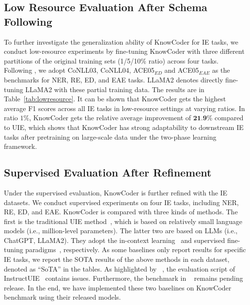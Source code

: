 \subsection{Low Resource Evaluation After Schema Following} 

To further investigate the generalization ability of KnowCoder for IE tasks, we conduct low-resource experiments by fine-tuning KnowCoder with three different partitions of the original training sets (1/5/10\% ratio) across four tasks. Following \citet{lu-etal-2022-unified},
we adopt CoNLL03, CoNLL04, ACE05$_{ED}$ and ACE05$_{EAE}$ as the benchmarks for NER, RE, ED, and EAE tasks. LLaMA2 denotes directly fine-tuning LLaMA2 with these partial training data. The results are in Table~\ref{tab:lowresource}. It
can be shown that KnowCoder gets the highest average F1 scores across all IE tasks in low-resource settings at varying ratios. In ratio $1\%$, KnowCoder gets the relative average improvement of $\textbf{21.9\%}$ compared to UIE, which shows that KnowCoder has strong adaptability to downstream IE tasks after pretraining on large-scale data under the two-phase learning framework. 

\subsection{Supervised Evaluation After Refinement}
  
  
Under the supervised evaluation, KnowCoder is further refined with the IE datasets. We conduct supervised experiments on four IE tasks, including NER, RE, ED, and EAE. KnowCoder is compared with three kinds of methods. The first is the traditional UIE method~\cite{lou2023universal, lu-etal-2022-unified}, which is based on relatively small language models (i.e., million-level parameters). The latter two are based on LLMs (i.e., ChatGPT, LLaMA2). They adopt the in-context learning~\cite{guo2023retrieval, codeie, ashok2023promptner} and supervised fine-tuning paradigms~\cite{zhou2023universalner,wang2023instructuie,sainz2023gollie}, respectively. As some baselines only report results for specific IE tasks, we report the SOTA results of the above methods in each dataset, denoted as ``SoTA'' in the tables. As highlighted by ~\citet{zhou2023universalner}, the evaluation script of InstructUIE~\cite{wang2023instructuie} contains issues. Furthermore, the benchmark in ~\citet{zhou2023universalner} remains pending release. In the end, we have implemented these two baselines on KnowCoder benchmark using their released models.


